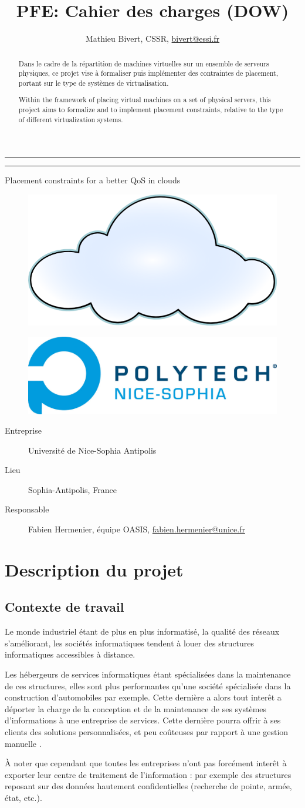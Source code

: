 \documentclass[a4paper]{article}
\author{Mathieu Bivert, CSSR, \href{mailto:bivert@essi.fr}{bivert@essi.fr}}
\title{PFE: Cahier des charges (DOW)}
\makeatletter
\def\maketitle{%
  \null
  \thispagestyle{empty}%
  \vskip 1cm
  \begin{flushright}
        \normalfont\Large\@author
  \end{flushright}
  \vfil
  \hrule height 2pt
  \par
  \begin{center}
        \huge \strut \@title \par
  \end{center}
  \hrule height 2pt
  \par
  \vfil
  \vfil
  \null
\begin{center}
\Huge{Placement constraints for a better QoS in clouds}
\end{center}
\begin{figure}[!ht]
	\centering
	\includegraphics[scale=.45]{imgs/cloud.png}
\end{figure}
\vfil
\begin{figure}[!ht]
	\centering
	\includegraphics[scale=.5]{imgs/polytech.png}
\end{figure}
\vfil
\begin{description}
	\item[Entreprise] Université de Nice-Sophia Antipolis
	\item[Lieu] Sophia-Antipolis, France
	\item[Responsable] Fabien Hermenier, équipe OASIS,
		\href{mailto:fabien.hermenier@unice.fr}{fabien.hermenier@unice.fr}
\end{description}
\cleardoublepage
}
\makeatother
\begin{document}
\maketitle

\begin{abstract}
Dans le cadre de la répartition de machines virtuelles sur un ensemble de
serveurs physiques, ce projet vise à formaliser puis implémenter des
contraintes de placement, portant sur le type de systèmes de virtualisation.
\end{abstract}

\begin{abstract}
Within the framework of placing virtual machines on a set of physical servers,
this project aims to formalize and to implement placement constraints,
relative to the type of different virtualization systems.
\end{abstract}

\tableofcontents
\newpage
\section{Description du projet}
\subsection{Contexte de travail}
Le monde industriel étant de plus en plus informatisé, la qualité des
réseaux s'améliorant, les sociétés informatiques tendent à  louer des
structures informatiques accessibles à distance.

Les hébergeurs de services informatiques étant spécialisées dans la
maintenance de ces structures, elles sont plus performantes qu'une société
spécialisée dans la construction d'automobiles par exemple.
Cette dernière a alors tout interêt a déporter la charge de la conception
et de la maintenance de ses systèmes d'informations à une entreprise
de services. Cette dernière pourra offrir à ses clients des solutions
personnalisées, et peu coûteuses par rapport à une gestion \og manuelle \fg.


À noter que cependant que toutes les entreprises n'ont pas forcément
interêt à exporter leur centre de traitement de l'information : par
exemple des structures reposant sur des données hautement confidentielles
(recherche de pointe, armée, état, etc.).
\end{document}

